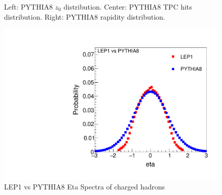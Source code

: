 \begin{figure}[H]
\centering
{}\hfill
{}\hfill %
\hfill %
\caption{Left: PYTHIA8 $z_0$ distribution. Center: PYTHIA8 TPC hits distribution. Right: PYTHIA8 rapidity distribution.}
\end{figure}

\begin{figure}[H]
\begin{center}
\includegraphics[width=.45\textwidth]{images/DataQualityCheck/eta_LEP1_PYTHIA8.pdf}
\caption{LEP1 vs PYTHIA8 Eta Spectra of charged hadrons}
\label{fig:figure10} 
\end{center}
\end{figure}

